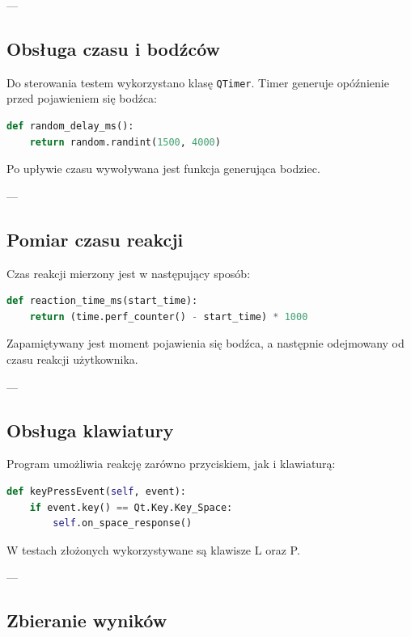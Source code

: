 \documentclass[12pt,a4paper]{article}
\begin{document}
---

\subsection{Obsługa czasu i bodźców}

Do sterowania testem wykorzystano klasę \texttt{QTimer}. Timer generuje opóźnienie przed pojawieniem się bodźca:

\begin{lstlisting}[language=Python, caption=Losowe opóźnienie przed bodźcem]
def random_delay_ms():
    return random.randint(1500, 4000)
\end{lstlisting}

Po upływie czasu wywoływana jest funkcja generująca bodziec.

---

\subsection{Pomiar czasu reakcji}

Czas reakcji mierzony jest w następujący sposób:

\begin{lstlisting}[language=Python, caption=Pomiar czasu reakcji]
def reaction_time_ms(start_time):
    return (time.perf_counter() - start_time) * 1000
\end{lstlisting}

Zapamiętywany jest moment pojawienia się bodźca, a następnie odejmowany od czasu reakcji użytkownika.

---

\subsection{Obsługa klawiatury}

Program umożliwia reakcję zarówno przyciskiem, jak i klawiaturą:

\begin{lstlisting}[language=Python, caption=Obsługa klawiatury]
def keyPressEvent(self, event):
    if event.key() == Qt.Key.Key_Space:
        self.on_space_response()
\end{lstlisting}

W testach złożonych wykorzystywane są klawisze L oraz P.

---

\subsection{Zbieranie wyników}
\end{document}
